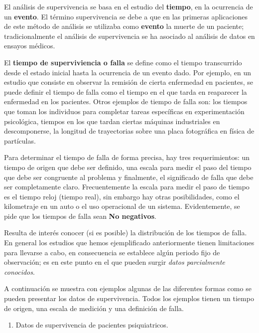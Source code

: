 \documentclass[
  a4paper,
  oneside,
  openany]{book}
\providecommand{\tightlist}{%
  \setlength{\itemsep}{0pt}\setlength{\parskip}{0pt}}
\begin{document}
El análisis de supervivencia se basa en el estudio del \textbf{tiempo}, en la ocurrencia de un \textbf{evento}. El término supervivencia se debe a que en las primeras aplicaciones de este método de análisis se utilizaba como \textbf{evento} la muerte de un paciente; tradicionalmente el análisis de supervivencia se ha asociado al análisis de datos en ensayos médicos.

El \textbf{tiempo de superviviencia o falla} se define como el tiempo transcurrido desde el estado inicial hasta la ocurrencia de un evento dado. Por ejemplo, en un estudio que consiste en observar la remisión de cierta enfermedad en pacientes, se puede definir el tiempo de falla como el tiempo en el que tarda en reaparecer la enfermedad en los pacientes. Otros ejemplos de tiempo de falla son: los tiempos que toman los individuos para completar tareas específicas en experimentación psicológica, tiempos en los que tardan ciertas máquinas industriales en descomponerse, la longitud de trayectorias sobre una placa fotográfica en física de partículas.

Para determinar el tiempo de falla de forma precisa, hay tres requerimientos: un tiempo de origen que debe ser definido, una escala para medir el paso del tiempo que debe ser congruente al problema y finalmente, el significado de falla que debe ser completamente claro. Frecuentemente la escala para medir el paso de tiempo es el tiempo reloj (tiempo real), sin embargo hay otras posibilidades, como el kilometraje en un auto o el uso operacional de un sistema. Evidentemente, se pide que los tiempos de falla sean \textbf{No negativos}.

Resulta de interés conocer (si es posible) la distribución de los tiempos de falla. En general los estudios que hemos ejemplificado anteriormente tienen limitaciones para llevarse a cabo, en consecuencia se establece algún periodo fijo de observación; es en este punto en el que pueden surgir \emph{datos parcialmente conocidos}.

A continuación se muestra con ejemplos algunas de las diferentes formas como se pueden presentar los datos de supervivencia. Todos los ejemplos tienen un tiempo de origen, una escala de medición y una definición de falla.

\begin{enumerate}
\def\labelenumi{\arabic{enumi}.}
\tightlist
\item
  Datos de supervivencia de pacientes psiquiatricos.
\end{enumerate}
\end{document}
